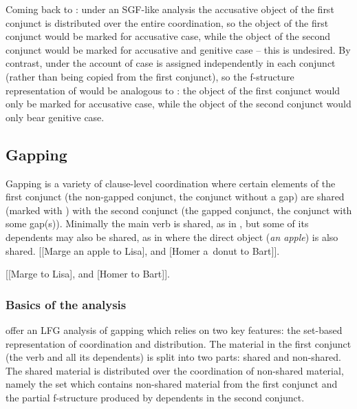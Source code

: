 \documentclass[output=paper]{../langscibook}
\begin{document}
Coming back to :
under an SGF-like analysis the accusative
object of the first conjunct is distributed over the entire coordination,
so the object of the first conjunct would be marked for
accusative case, while the object of the second conjunct would be marked for
accusative and genitive case – this is undesired. By contrast, under the account of
\citet{PatejukPrzepiorkowski2015} case is assigned independently in each
conjunct (rather than being copied from the first conjunct), so the
f-structure representation of 
would be analogous to : the object of
the first conjunct would only be marked for accusative case, while the
object of the second conjunct would only bear genitive case.

\subsection{Gapping}
\label{sec:Coordination:ell:gap}

Gapping is a variety of clause-level coordination where certain
elements of the first conjunct (the non-gapped conjunct, the conjunct
without a gap) are shared (marked with ) with the second
conjunct (the gapped conjunct, the conjunct with some gap(s)).
Minimally the main verb is shared, as in , but
some of its dependents may also be shared, as in
 where the direct object (\emph{an apple}) is
also shared.
\ea\label{ex:pat:prz:17:1}
[[Marge  an apple to Lisa], and [Homer a~donut to Bart]].
\\ \hspace*{\fill} \citep[(1)]{PatejukPrzepiorkowski2017}
\item\label{ex:pat:prz:17:2}
[[Marge   to Lisa], and [Homer to Bart]].
\\ \hspace*{\fill} \citep[(2)]{PatejukPrzepiorkowski2017}
\z

\subsubsection{Basics of the \citet{PatejukPrzepiorkowski2017} analysis}
\label{sec:Coordination:ell:gap:basics}

\citet{PatejukPrzepiorkowski2017} offer an LFG analysis of gapping which relies
on two key features: the set-based representation of coordination and
distribution.
%
The material in the first conjunct (the verb and all its dependents) is split into two
parts: shared and non-shared. The shared material is distributed over
the coordination of non-shared material, namely the set which contains
non-shared material from the first conjunct and the partial
f-structure produced by dependents in the second conjunct.
\end{document}
